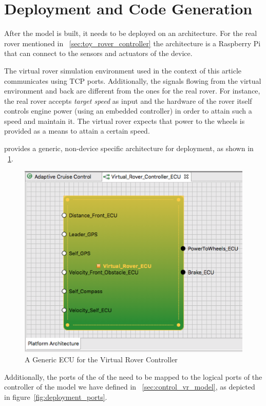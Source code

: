 \section{Deployment and Code Generation}
\label{sec:deploy_generate}

After the model is built, it needs to be deployed on an architecture. For the
real rover mentioned in \sect~\ref{sec:toy_rover_controller} the architecture
is a Raspberry Pi that can connect to the sensors and actuators of the device.

The virtual rover simulation environment used in the context of this article
communicates using TCP ports. Additionally, the signals flowing from the virtual
environment and back are different from the ones for the real rover. For
instance, the real rover accepts \emph{target speed} as input and the hardware
of the rover itself controls engine power (using an embedded \pid controller) in
order to attain such a speed and maintain it. The virtual rover expects that
power to the wheels is provided as a means to attain a certain speed.

\af provides a generic, non-device specific architecture for deployment, as
shown in \fig~\ref{fig:deployment_general}.

\begin{figure}[!h]
\centering
\includegraphics[width=.8\textwidth]{images/deployment_general.png}
\caption{A Generic ECU for the Virtual Rover Controller}
\label{fig:deployment_general}
\end{figure}

Additionally, the ports of the of the \ecu need to be mapped to the logical
ports of the controller of the model we have defined in
\sect~\ref{sec:control_vr_model}, as depicted in
figure~\ref{fig:deployment_ports}.

